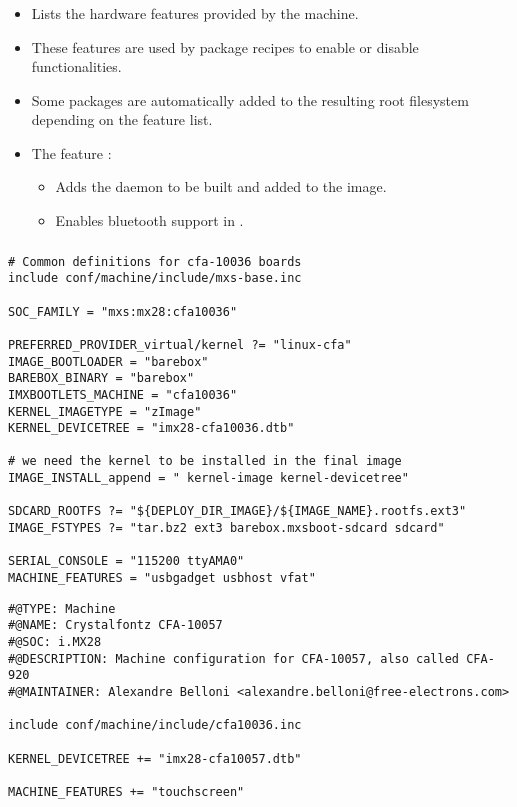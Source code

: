 \begin{frame}
  \frametitle{}
  \begin{itemize}
    \item Lists the hardware features provided by the machine.
    \item These features are used by package recipes to enable or
      disable functionalities.
    \item Some packages are automatically added to the resulting root
    filesystem depending on the feature list.
    \item The feature :
      \begin{itemize}
        \item Adds the  daemon to be built and added to
          the image.
        \item Enables bluetooth support in .
      \end{itemize}
  \end{itemize}
\end{frame}

\begin{frame}[fragile]
  \frametitle{}
  \begin{block}{}
    \begin{verbatim}
# Common definitions for cfa-10036 boards
include conf/machine/include/mxs-base.inc

SOC_FAMILY = "mxs:mx28:cfa10036"

PREFERRED_PROVIDER_virtual/kernel ?= "linux-cfa"
IMAGE_BOOTLOADER = "barebox"
BAREBOX_BINARY = "barebox"
IMXBOOTLETS_MACHINE = "cfa10036"
KERNEL_IMAGETYPE = "zImage"
KERNEL_DEVICETREE = "imx28-cfa10036.dtb"

# we need the kernel to be installed in the final image
IMAGE_INSTALL_append = " kernel-image kernel-devicetree"

SDCARD_ROOTFS ?= "${DEPLOY_DIR_IMAGE}/${IMAGE_NAME}.rootfs.ext3"
IMAGE_FSTYPES ?= "tar.bz2 ext3 barebox.mxsboot-sdcard sdcard"

SERIAL_CONSOLE = "115200 ttyAMA0"
MACHINE_FEATURES = "usbgadget usbhost vfat"
    \end{verbatim}
  \end{block}
\end{frame}

\begin{frame}[fragile]{}
  \begin{block}{}
    \begin{verbatim}
#@TYPE: Machine
#@NAME: Crystalfontz CFA-10057
#@SOC: i.MX28
#@DESCRIPTION: Machine configuration for CFA-10057, also called CFA-920
#@MAINTAINER: Alexandre Belloni <alexandre.belloni@free-electrons.com>

include conf/machine/include/cfa10036.inc

KERNEL_DEVICETREE += "imx28-cfa10057.dtb"

MACHINE_FEATURES += "touchscreen"
    \end{verbatim}
  \end{block}
\end{frame}

